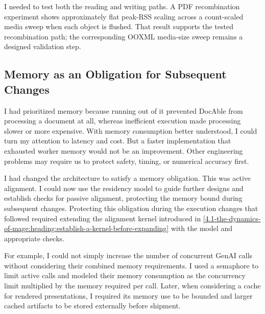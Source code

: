 I needed to test both the reading and writing paths. A PDF recombination experiment shows approximately flat peak-RSS scaling across a count-scaled media sweep when each object is flushed. That result supports the tested recombination path; the corresponding OOXML media-size sweep remains a designed validation step.


\subsection{Memory as an Obligation for Subsequent Changes}\label{heading:memory-did-not-stop-mattering}

I had prioritized memory because running out of it prevented DocAble from processing a document at all, whereas inefficient execution made processing slower or more expensive. With memory consumption better understood, I could turn my attention to latency and cost. But a faster implementation that exhausted worker memory would not be an improvement. Other engineering problems may require us to protect safety, timing, or numerical accuracy first.

I had changed the architecture to satisfy a memory obligation. This was active alignment. I could now use the residency model to guide further designs and establish checks for passive alignment, protecting the memory bound during subsequent changes. Protecting this obligation during the execution changes that followed required extending the alignment kernel introduced in \cref{4.1-the-dynamics-of-mage:heading:establish-a-kernel-before-expanding} with the model and appropriate checks.

For example, I could not simply increase the number of concurrent GenAI calls without considering their combined memory requirements. I used a semaphore to limit active calls and modeled their memory consumption as the concurrency limit multiplied by the memory required per call. Later, when considering a cache for rendered presentations, I required its memory use to be bounded and larger cached artifacts to be stored externally before shipment.

